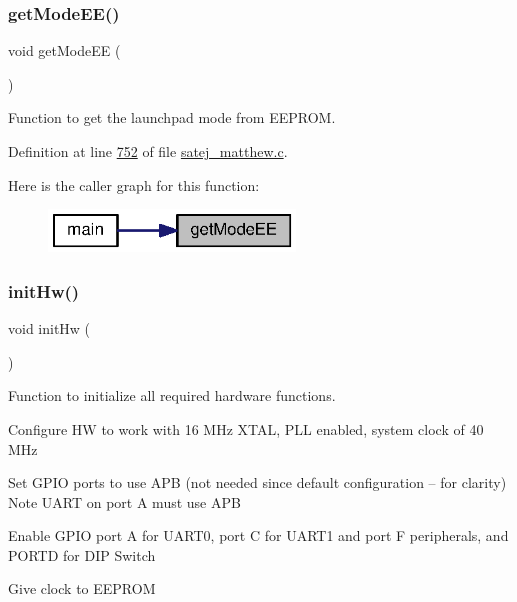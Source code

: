 \subsubsection{\texorpdfstring{getModeEE()}{getModeEE()}}
{\footnotesize\ttfamily void get\+Mode\+EE (\begin{DoxyParamCaption}{ }\end{DoxyParamCaption})}



Function to get the launchpad mode from E\+E\+P\+R\+OM. 



Definition at line \mbox{\hyperlink{satej__matthew_8c_source_l00752}{752}} of file \mbox{\hyperlink{satej__matthew_8c_source}{satej\+\_\+matthew.\+c}}.

Here is the caller graph for this function\+:
\nopagebreak
\begin{figure}[H]
\begin{center}
\leavevmode
\includegraphics[width=186pt]{satej__matthew_8c_a19138fc0f5846980204bb7be7e119d56_icgraph}
\end{center}
\end{figure}
\mbox{\label{satej__matthew_8c_ae5e20c90f0611c1fd09fad99cc3a30a6}} 
\subsubsection{\texorpdfstring{initHw()}{initHw()}}
{\footnotesize\ttfamily void init\+Hw (\begin{DoxyParamCaption}{ }\end{DoxyParamCaption})}



Function to initialize all required hardware functions. 

Configure HW to work with 16 M\+Hz X\+T\+AL, P\+LL enabled, system clock of 40 M\+Hz

Set G\+P\+IO ports to use A\+PB (not needed since default configuration -- for clarity) Note U\+A\+RT on port A must use A\+PB

Enable G\+P\+IO port A for U\+A\+R\+T0, port C for U\+A\+R\+T1 and port F peripherals, and P\+O\+R\+TD for D\+IP Switch

Give clock to E\+E\+P\+R\+OM

